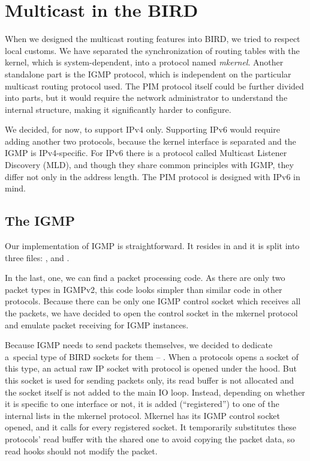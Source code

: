 \chapter{Multicast in the BIRD}

When we designed the multicast routing features into BIRD, we tried to respect
local customs. We have separated the synchronization of routing tables with the
kernel, which is system-dependent, into a protocol named \emph{mkernel}.
Another standalone part is the IGMP protocol, which is independent on the
particular multicast routing protocol used. The PIM protocol itself could be
further divided into parts, but it would require the network administrator to
understand the internal structure, making it significantly harder to configure.

We decided, for now, to support IPv4 only. Supporting IPv6 would require adding
another two protocols, because the kernel interface is separated and the IGMP is
IPv4-specific. For IPv6 there is a protocol called Multicast Listener Discovery
(MLD), and though they share common principles with IGMP, they differ not only
in the address length. The PIM protocol is designed with IPv6 in mind.

\section{The IGMP}

Our implementation of IGMP is straightforward. It resides in
 and it is split into three files: ,
 and .

In the last, one, we can find a packet processing code. As there are only two
packet types in IGMPv2, this code looks simpler than similar code in other
protocols. Because there can be only one IGMP control socket which receives all
the packets, we have decided to open the control socket in the mkernel protocol
and emulate packet receiving for IGMP instances.

Because IGMP needs to send packets themselves, we decided to dedicate a~special
type of BIRD sockets for them -- . When a protocols opens
a socket of this type, an actual raw IP socket with protocol
 is opened under the hood. But this socket is used for
sending packets only, its read buffer is not allocated and the socket itself is
not added to the main IO loop. Instead, depending on whether it is specific to
one interface or not, it is added (``registered'') to one of the internal lists
in the mkernel protocol. Mkernel has its IGMP control socket opened, and it calls
 for every registered socket. It temporarily substitutes these
protocols' read buffer with the shared one to avoid copying the packet data, so
read hooks should not modify the packet.

